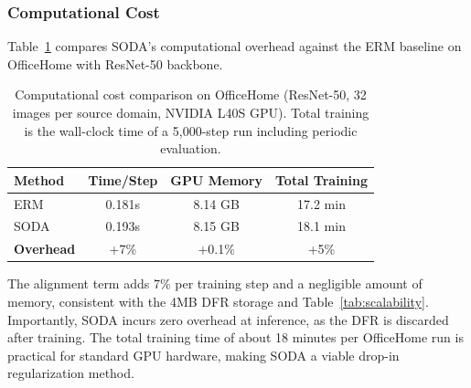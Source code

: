 \subsubsection{Computational Cost}
\label{sssec:computational_cost}

Table~\ref{tab:timing} compares SODA's computational overhead against the ERM baseline on OfficeHome with ResNet-50 backbone.

\begin{table}[t]
\caption{Computational cost comparison on OfficeHome (ResNet-50, 32 images per source domain, NVIDIA L40S GPU). Total training is the wall-clock time of a 5,000-step run including periodic evaluation.}
\label{tab:timing}
\centering
\small
\begin{tabular}{lccc}
\toprule
\textbf{Method} & \textbf{Time/Step} & \textbf{GPU Memory} & \textbf{Total Training} \\
\midrule
ERM & 0.181s & 8.14 GB & 17.2 min \\
SODA & 0.193s & 8.15 GB & 18.1 min \\
\midrule
\textbf{Overhead} & +7\% & +0.1\% & +5\% \\
\bottomrule
\end{tabular}
\end{table}

The alignment term adds 7\% per training step and a negligible amount of memory, consistent with the 4MB DFR storage and Table~\ref{tab:scalability}. Importantly, SODA incurs zero overhead at inference, as the DFR is discarded after training. The total training time of about 18 minutes per OfficeHome run is practical for standard GPU hardware, making SODA a viable drop-in regularization method.

